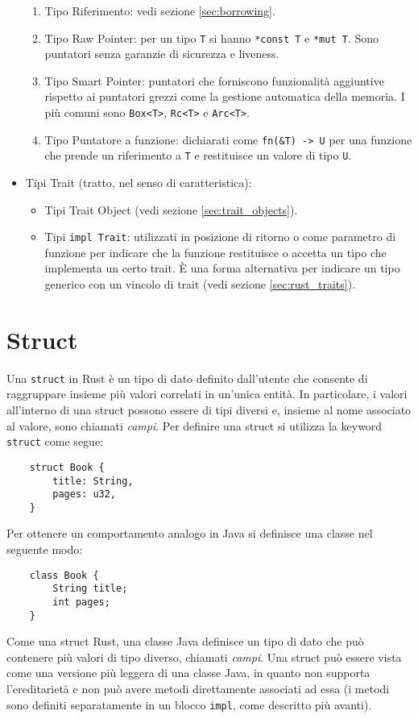 \begin{itemize}
            \begin{enumerate}
                \item Tipo Riferimento: vedi sezione \ref{sec:borrowing}. 
                \item Tipo Raw Pointer: per un tipo \texttt{T} si hanno \texttt{*const T} e \texttt{*mut T}. Sono puntatori senza garanzie di sicurezza e liveness.
                \item Tipo Smart Pointer: puntatori che forniscono funzionalità aggiuntive rispetto ai puntatori grezzi come la gestione automatica della memoria. I più comuni sono \texttt{Box<T>}, \texttt{Rc<T>} e \texttt{Arc<T>}. 
                \item Tipo Puntatore a funzione: dichiarati come \texttt{fn(\&T) -> U} per una funzione che prende un riferimento a \texttt{T} e restituisce un valore di tipo \texttt{U}.
            \end{enumerate}
        \item Tipi Trait (tratto, nel senso di caratteristica): 
        \begin{itemize}
            \item Tipi Trait Object (vedi sezione \ref{sec:trait_objects}).
            \item Tipi \texttt{impl Trait}: utilizzati in posizione di ritorno o come parametro di funzione per indicare che la funzione restituisce o accetta un tipo che implementa un certo trait. È una forma alternativa per indicare un tipo generico con un vincolo di trait (vedi sezione \ref{sec:rust_traits}).
        \end{itemize}
\end{itemize}
\section{Struct}
\label{sec:structs}
Una \texttt{struct} in Rust è un tipo di dato definito dall'utente che consente di raggruppare insieme più valori correlati in un'unica entità. In particolare, i valori all'interno di una struct possono essere di tipi diversi e, insieme al nome associato al valore, sono chiamati \textit{campi}. Per definire una struct si utilizza la keyword \texttt{struct} come segue:
\begin{verbatim}
    struct Book {
        title: String,
        pages: u32,
    }
\end{verbatim}
Per ottenere un comportamento analogo in Java si definisce una classe nel seguente modo:
\begin{verbatim}
    class Book {
        String title;
        int pages;
    }
\end{verbatim}
Come una struct Rust, una classe Java definisce un tipo di dato che può contenere più valori di tipo diverso, chiamati \textit{campi}. Una struct può essere vista come una versione più leggera di una classe Java, in quanto non supporta l'ereditarietà e non può avere metodi direttamente associati ad essa (i metodi sono definiti separatamente in un blocco \texttt{impl}, come descritto più avanti).

